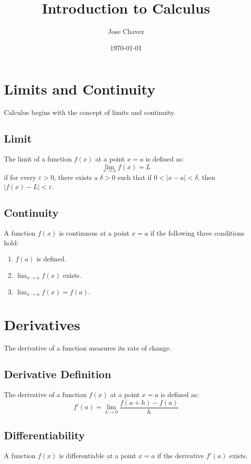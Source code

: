 \documentclass{article}
\title{Introduction to Calculus}
\author{Jose Chavez}
\date{\today}
\begin{document}
\maketitle

\section{Limits and Continuity}
Calculus begins with the concept of limits and continuity.

\subsection{Limit}
The limit of a function \(f(x)\) at a point \(x = a\) is defined as:
\[
\lim_{{x \to a}} f(x) = L
\]
if for every \(\varepsilon > 0\), there exists a \(\delta > 0\) such that if \(0 < |x - a| < \delta\), then \(|f(x) - L| < \varepsilon\).

\subsection{Continuity}
A function \(f(x)\) is continuous at a point \(x = a\) if the following three conditions hold:
\begin{enumerate}
    \item \(f(a)\) is defined.
    \item \(\lim_{{x \to a}} f(x)\) exists.
    \item \(\lim_{{x \to a}} f(x) = f(a)\).
\end{enumerate}

\section{Derivatives}
The derivative of a function measures its rate of change.

\subsection{Derivative Definition}
The derivative of a function \(f(x)\) at a point \(x = a\) is defined as:
\[
f'(a) = \lim_{{h \to 0}} \frac{f(a + h) - f(a)}{h}
\]

\subsection{Differentiability}
A function \(f(x)\) is differentiable at a point \(x = a\) if the derivative \(f'(a)\) exists.
\end{document}
